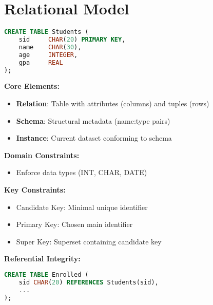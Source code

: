 \documentclass[12pt]{article}
\begin{document}
\section{Relational Model}
\begin{tcolorbox}[colback=blue!5!white,colframe=blue!75!black,title=Structural Components]
\begin{lstlisting}[language=SQL]
CREATE TABLE Students (
    sid     CHAR(20) PRIMARY KEY,
    name    CHAR(30),
    age     INTEGER,
    gpa     REAL
);
\end{lstlisting}

\textbf{Core Elements:}
\begin{itemize}
    \item \textbf{Relation}: Table with attributes (columns) and tuples (rows)
    \item \textbf{Schema}: Structural metadata (name:type pairs)
    \item \textbf{Instance}: Current dataset conforming to schema
\end{itemize}
\end{tcolorbox}

\begin{tcolorbox}[colback=red!5!white,colframe=red!75!black,title=Constraints]
\textbf{Domain Constraints:}
\begin{itemize}
    \item Enforce data types (INT, CHAR, DATE)
\end{itemize}

\textbf{Key Constraints:}
\begin{itemize}
    \item Candidate Key: Minimal unique identifier
    \item Primary Key: Chosen main identifier
    \item Super Key: Superset containing candidate key
\end{itemize}

\textbf{Referential Integrity:}
\begin{lstlisting}[language=SQL]
CREATE TABLE Enrolled (
    sid CHAR(20) REFERENCES Students(sid),
    ...
);
\end{lstlisting}
\end{tcolorbox}
\end{document}
